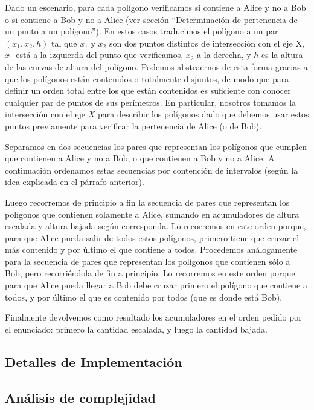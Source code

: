 Dado un escenario, para cada polígono verificamos si contiene a Alice y
no a Bob o si contiene a Bob y no a Alice (ver sección ``Determinación
de pertenencia de un punto a un polígono''). En estos casos traducimos
el polígono a un par $(x_1, x_2, h)$ tal que $x_1$ y $x_2$ son dos puntos
distintos de intersección con el eje X, $x_1$ está a la izquierda del punto
que verificamos, $x_2$ a la derecha, y $h$ es la altura de las curvas de altura
del polígono. Podemos abstraernos de esta forma gracias a que los polígonos
están contenidos o totalmente disjuntos, de modo que para definir un orden
total entre los que están contenidos es suficiente con conocer cualquier par de
puntos de sus perímetros. En particular, nosotros tomamos la intersección
con el eje $X$ para describir los polígonos dado que debemos usar estos
puntos previamente para verificar la pertenencia de Alice (o de Bob).

Separamos en dos secuencias los pares que representan los polígonos que
cumplen que contienen a Alice y no a Bob, o que contienen a Bob y no a Alice. A
continuación ordenamos estas secuencias por contención de intervalos
(según la idea explicada en el párrafo anterior).

Luego recorremos de principio a fin la secuencia de pares que representan los
polígonos que contienen solamente a Alice, sumando en acumuladores de altura
escalada y altura bajada según corresponda. Lo recorremos en este orden
porque, para que Alice pueda salir de todos estos polígonos, primero tiene que
cruzar el más contenido y por último el que contiene a todos. Procedemos
análogamente para la secuencia de pares que representan los polígonos que
contienen sólo a Bob, pero recorriéndola de fin a principio. Lo recorremos
en este orden porque para que Alice pueda llegar a Bob debe cruzar primero el
polígono que contiene a todos, y por último el que es contenido por todos
(que es donde está Bob).

Finalmente devolvemos como resultado los acumuladores en el orden pedido
por el enunciado: primero la cantidad escalada, y luego la cantidad bajada.


\subsection*{Detalles de Implementación}

\subsection*{Análisis de complejidad}
